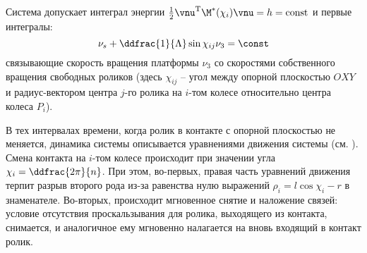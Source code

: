 
Система допускает интеграл энергии $\frac{1}{2}\vnu^\mathrm{T}\M^*(\chi_i)\vnu = h = \mathrm{const}$ и первые интегралы:
\begin{equation}
    \label{int_free_roller}
\nu_s + \ddfrac{1}{\Lambda}\sin\chi_{ij}\nu_3 = \const
\end{equation}
связывающие скорость вращения платформы $\nu_3$ со скоростями собственного вращения свободных роликов (здесь $\chi_{ij}$ -- угол между опорной плоскостью $OXY$ и радиус-вектором центра $j$-го ролика на $i$-том колесе относительно центра колеса $P_i$).

В тех интервалах времени, когда ролик в контакте с опорной плоскостью не меняется, динамика системы описывается уравнениями движения системы (см. \cite{ZobovaGerasimovPMM}). Смена контакта на $i$-том колесе происходит при значении угла $\chi_i = \ddfrac{2\pi}{n}$. При этом, во-первых, правая часть уравнений движения терпит разрыв второго рода из-за равенства нулю выражений $\rho_i = l\cos\chi_i-r$ в знаменателе. Во-вторых, происходит мгновенное снятие и наложение связей: условие отсутствия проскальзывания для ролика, выходящего из контакта, снимается, и аналогичное ему мгновенно налагается на вновь входящий в контакт ролик.

